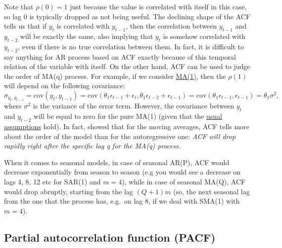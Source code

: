 \documentclass[
]{book}
\theoremstyle{definition}
\theoremstyle{definition}
\theoremstyle{definition}
\theoremstyle{definition}
\theoremstyle{remark}
\begin{document}
Note that \(\rho(0)=1\) just because the value is correlated with itself in this case, so lag 0 is typically dropped as not being useful. The declining shape of the ACF tells us that if \(y_t\) is correlated with \(y_{t-1}\), then the correlation between \(y_{t-1}\) and \(y_{t-2}\) will be exactly the same, also implying that \(y_{t}\) is somehow correlated with \(y_{t-2}\), even if there is no true correlation between them. In fact, it is difficult to say anything for AR process based on ACF exactly because of this temporal relation of the variable with itself. On the other hand, ACF can be used to judge the order of MA(q) process. For example, if we consider \protect\hyperlink{MA}{MA(1)}, then the \(\rho(1)\) will depend on the following covariance:
\begin{equation}
  \sigma_{y_t,y_{t-1}} = \mathrm{cov}(y_t,y_{t-1}) = \mathrm{cov}(\theta_1 \epsilon_{t-1} + \epsilon_t, \theta_1 \epsilon_{t-2} + \epsilon_{t-1}) = \mathrm{cov}(\theta_1 \epsilon_{t-1}, \epsilon_{t-1}) = \theta_1 \sigma^2 ,
  \label{eq:autoCovarianceMA1}
\end{equation}
where \(\sigma^2\) is the variance of the error term. However, the covariance between \(y_t\) and \(y_{t-2}\) will be equal to zero for the pure MA(1) (given that the \protect\hyperlink{assumptions}{usual assumptions} hold). In fact, \citet{Box1976} showed that for the moving averages, ACF tells more about the order of the model than for the autoregressive one: \emph{ACF will drop rapidly right after the specific lag q for the MA(q) process}.

When it comes to seasonal models, in case of seasonal AR(P), ACF would decrease exponentially from season to season (e.g you would see a decrease on lags 4, 8, 12 etc for SAR(1) and \(m=4\)), while in case of seasonal MA(Q), ACF would drop abruptly, starting from the lag \((Q+1)m\) (so, the next seasonal lag from the one that the process has, e.g.~on lag 8, if we deal with SMA(1) with \(m=4\)).

\hypertarget{PACF}{%
\subsection{Partial autocorrelation function (PACF)}\label{PACF}}
\end{document}
